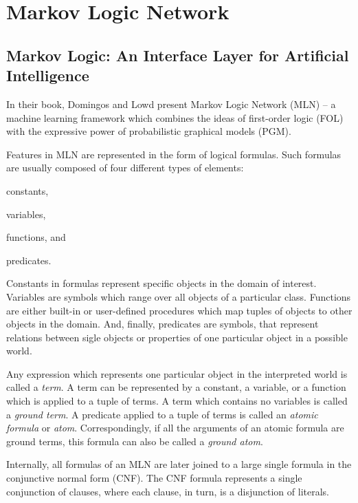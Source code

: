 \documentclass[a4paper,11pt]{article}
\begin{document}
\section{Markov Logic Network}

\subsection{Markov Logic: An Interface Layer for Artificial Intelligence \cite{Domingos-09}}

In their book, Domingos and Lowd present Markov Logic Network (MLN) -- a
machine learning framework which combines the ideas of first-order logic (FOL)
with the expressive power of probabilistic graphical models (PGM).

Features in MLN are represented in the form of logical formulas.  Such
formulas are usually composed of four different types of elements:
\begin{inparaenum}
\item constants,
\item variables,
\item functions, and
\item predicates.
\end{inparaenum}

Constants in formulas represent specific objects in the domain of interest.
Variables are symbols which range over all objects of a particular class.
Functions are either built-in or user-defined procedures which map tuples of
objects to other objects in the domain.  And, finally, predicates are symbols,
that represent relations between sigle objects or properties of one particular
object in a possible world.

Any expression which represents one particular object in the interpreted world
is called a \textit{term}.  A term can be represented by a constant, a
variable, or a function which is applied to a tuple of terms.  A term which
contains no variables is called a \textit{ground term}.  A predicate applied
to a tuple of terms is called an \textit{atomic formula} or \textit{atom}.
Correspondingly, if all the arguments of an atomic formula are ground terms,
this formula can also be called a \textit{ground atom}.

Internally, all formulas of an MLN are later joined to a large single formula
in the conjunctive normal form (CNF).  The CNF formula represents a single
conjunction of clauses, where each clause, in turn, is a disjunction of
literals.
\end{document}
